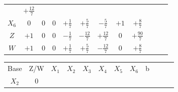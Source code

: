 \documentclass{beamer}
\begin{document}
\begin{frame}
{\begin{table}
\begin{tabular}{c c c c c c c c c c c c}
				& \cellcolor{yellow!50} $\scriptstyle +\frac{12}{7}$ \\
				\cellcolor{blue!100} \color{red} $\scriptstyle X_6$
				& \cellcolor{yellow!50} $\scriptstyle 0$
				& \cellcolor{yellow!50} $\scriptstyle 0$
				& \cellcolor{yellow!50} $\scriptstyle 0$
				& \cellcolor{yellow!50} $\scriptstyle +\frac{1}{7}$
				& \cellcolor{yellow!50} $\scriptstyle +\frac{5}{7}$
				& \cellcolor{yellow!50} $\scriptstyle -\frac{5}{7}$
				& \cellcolor{yellow!50} $\scriptstyle +1$
				& \cellcolor{yellow!50} $\scriptstyle +\frac{8}{7}$ \\
				\cellcolor{blue!100} \color{white} $\scriptstyle Z$
				& \cellcolor{yellow!50} $\scriptstyle +1$
				& \cellcolor{yellow!50} $\scriptstyle 0$
				& \cellcolor{yellow!50} $\scriptstyle 0$
				& \cellcolor{yellow!50} $\scriptstyle -\frac{1}{7}$
				& \cellcolor{yellow!50} $\scriptstyle -\frac{12}{7}$
				& \cellcolor{yellow!50} $\scriptstyle +\frac{12}{7}$
				& \cellcolor{yellow!50} $\scriptstyle 0$ 
				& \cellcolor{yellow!50} $\scriptstyle +\frac{90}{7}$  \\
				\cellcolor{blue!100} \color{white} $\scriptstyle W$
				& \cellcolor{yellow!90} $\scriptstyle +1$
				& \cellcolor{yellow!90} $\scriptstyle 0$
				& \cellcolor{yellow!90} $\scriptstyle 0$
				& \cellcolor{yellow!90} $\scriptstyle +\frac{1}{7}$
				& \cellcolor{yellow!90} $\scriptstyle +\frac{5}{7}$
				& \cellcolor{yellow!90} $\scriptstyle -\frac{12}{7}$
				& \cellcolor{yellow!90} $\scriptstyle 0$ 
				& \cellcolor{yellow!90} $\scriptstyle +\frac{8}{7}$  \\
			\end{tabular}
		\end{table}			
	}	
	{
		\begin{table}		
			\begin{tabular}{c c c c c c c c c c c c}
				\cline{1-8} 
				\cellcolor{blue!100} \color{white} \scriptsize Base 
				&\cellcolor{blue!100} \color{white} \scriptsize Z/W
				&\cellcolor{blue!100} \color{red} $\scriptstyle X_1$ 
				&\cellcolor{blue!100} \color{red} $\scriptstyle X_2$ 
				&\cellcolor{blue!100} \color{white}   $\scriptstyle X_3$ 
				&\cellcolor{blue!100} \color{white} $\scriptstyle X_4$ 
				&\cellcolor{blue!100} \color{white}   $\scriptstyle X_5$ 
				&\cellcolor{blue!100} \color{red}   $\scriptstyle X_6$ 
				&\cellcolor{blue!100} \color{white} \scriptsize b
				&
				&
				& \\
				\cellcolor{blue!100} \color{red} $\scriptstyle X_2$
				& \cellcolor{yellow!50} $\scriptstyle 0$

\end{tabular}
\end{table}}
\end{frame}
\end{document}
